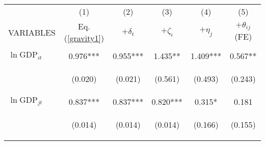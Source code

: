 \begin{center}
\begin{tabular}{lccccc} \hline
 & (1) & (2) & (3) & (4) & (5) \\
VARIABLES & Eq. (\ref{gravity1}) & $+\delta_t$ & $+\zeta_i$ & $+\eta_j$ & $+\theta_{ij}$ (FE) \\ \hline
\vspace{4pt} & \begin{footnotesize}\end{footnotesize} & \begin{footnotesize}\end{footnotesize} & \begin{footnotesize}\end{footnotesize} & \begin{footnotesize}\end{footnotesize} & \begin{footnotesize}\end{footnotesize} \\
$\ln\text{GDP}_{it}$ & 0.976*** & 0.955*** & 1.435** & 1.409*** & 0.567** \\
\vspace{4pt} & \begin{footnotesize}(0.020)\end{footnotesize} & \begin{footnotesize}(0.021)\end{footnotesize} & \begin{footnotesize}(0.561)\end{footnotesize} & \begin{footnotesize}(0.493)\end{footnotesize} & \begin{footnotesize}(0.243)\end{footnotesize} \\
$\ln\text{GDP}_{jt}$ & 0.837*** & 0.837*** & 0.820*** & 0.315* & 0.181 \\
\vspace{4pt} & \begin{footnotesize}(0.014)\end{footnotesize} & \begin{footnotesize}(0.014)\end{footnotesize} & \begin{footnotesize}(0.014)\end{footnotesize} & \begin{footnotesize}(0.166)\end{footnotesize} & \begin{footnotesize}(0.155)\end{footnotesize} \\

\end{tabular}
\end{center}
